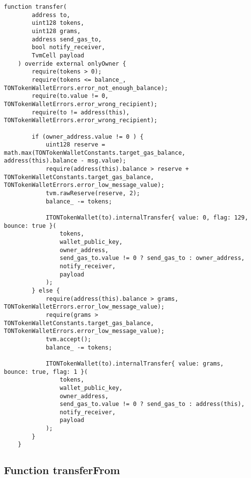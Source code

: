 \vspace{2cm}

\begin{lstlisting}[firstnumber=262]
    function transfer(
        address to,
        uint128 tokens,
        uint128 grams,
        address send_gas_to,
        bool notify_receiver,
        TvmCell payload
    ) override external onlyOwner {
        require(tokens > 0);
        require(tokens <= balance_, TONTokenWalletErrors.error_not_enough_balance);
        require(to.value != 0, TONTokenWalletErrors.error_wrong_recipient);
        require(to != address(this), TONTokenWalletErrors.error_wrong_recipient);

        if (owner_address.value != 0 ) {
            uint128 reserve = math.max(TONTokenWalletConstants.target_gas_balance, address(this).balance - msg.value);
            require(address(this).balance > reserve + TONTokenWalletConstants.target_gas_balance, TONTokenWalletErrors.error_low_message_value);
            tvm.rawReserve(reserve, 2);
            balance_ -= tokens;

            ITONTokenWallet(to).internalTransfer{ value: 0, flag: 129, bounce: true }(
                tokens,
                wallet_public_key,
                owner_address,
                send_gas_to.value != 0 ? send_gas_to : owner_address,
                notify_receiver,
                payload
            );
        } else {
            require(address(this).balance > grams, TONTokenWalletErrors.error_low_message_value);
            require(grams > TONTokenWalletConstants.target_gas_balance, TONTokenWalletErrors.error_low_message_value);
            tvm.accept();
            balance_ -= tokens;

            ITONTokenWallet(to).internalTransfer{ value: grams, bounce: true, flag: 1 }(
                tokens,
                wallet_public_key,
                owner_address,
                send_gas_to.value != 0 ? send_gas_to : address(this),
                notify_receiver,
                payload
            );
        }
    }
\end{lstlisting}

\subsection{Function transferFrom}



